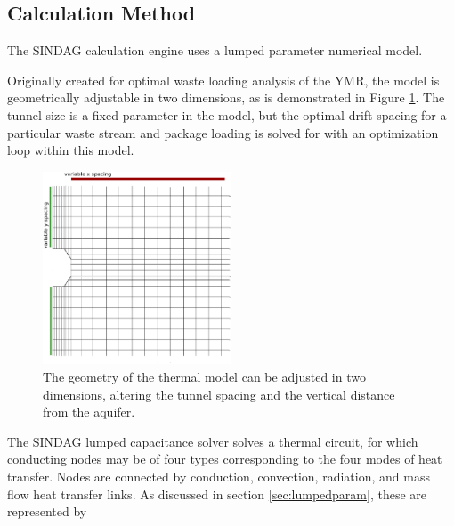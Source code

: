 \documentclass{anstrans}
\begin{document}
\subsection{Calculation Method}

The \gls{SINDAG} calculation engine uses a lumped parameter numerical model.

Originally created for optimal waste loading analysis of the \gls{YMR}, the 
model is geometrically adjustable in two dimensions,  as is demonstrated in 
Figure \ref{fig:sindageom}. The tunnel size is a fixed parameter in the model, 
but the optimal drift spacing for a particular waste stream and package loading 
is solved for with an optimization loop within this model.

\begin{figure}[htbp!]
  \begin{center}
    \includegraphics[width=0.5\textwidth]{./sindageom.eps}
  \end{center}
  \caption{The geometry of the thermal model can be adjusted in two dimensions, 
  altering the tunnel spacing and the vertical distance from the aquifer.}
  \label{fig:sindageom}
\end{figure}

The \gls{SINDAG} lumped capacitance solver solves a thermal circuit, for which 
conducting nodes may be of four types corresponding to the four modes of heat 
transfer. Nodes are connected by conduction, convection, radiation, and mass 
flow heat transfer links. As discussed in section \ref{sec:lumpedparam}, these 
are represented by
\end{document}
